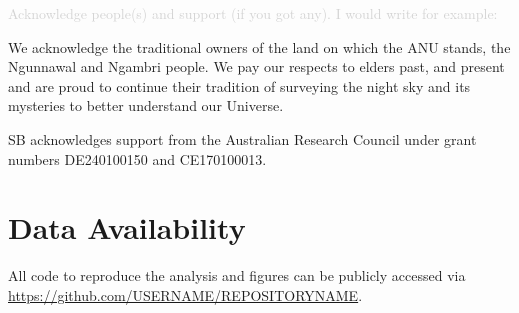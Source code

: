 \documentclass[twocolumn,apj,numberedappendix,appendixfloats]{openjournal}
\newcommand{\comment}[1]{\textcolor{lightgray}{#1}}
\begin{document}
\comment{Acknowledge people(s) and support (if you got any). I would write for example:}

We acknowledge the traditional owners of the land on which the ANU stands, the Ngunnawal and Ngambri people. We pay our respects to elders past, and present and are proud to continue their tradition of surveying the night sky and its mysteries to better understand our Universe.

SB acknowledges support from the Australian Research Council under grant numbers DE240100150 and CE170100013.

\section*{Data Availability}

All code to reproduce the analysis and figures can be publicly accessed via \url{https://github.com/USERNAME/REPOSITORYNAME}.






\end{document}
